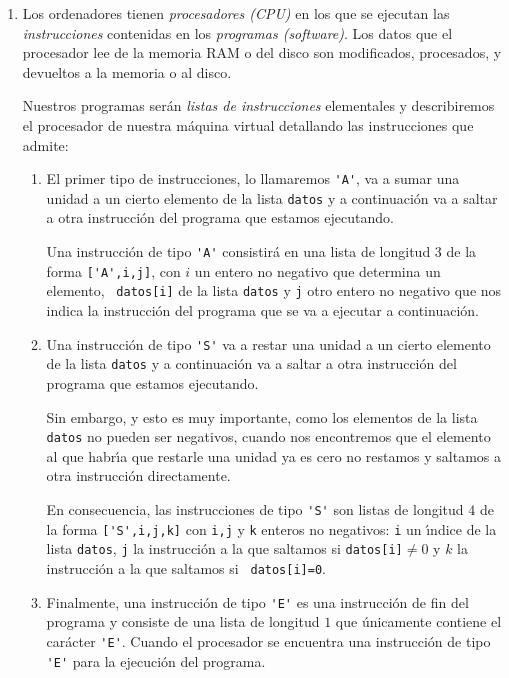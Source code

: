 \begin{appendices}
\begin{enumerate}
Nuestra m\'aquina virtual va a almacenar sus datos en una lista de enteros no
negativos de longitud arbitraria. 
Esta lista, a la que llamaremos {\tt datos},  va a simular al mismo tiempo la
memoria RAM y el disco duro.

\item Los ordenadores tienen {\itshape procesadores (CPU)} en los que se
ejecutan las {\itshape instrucciones} contenidas en los {\itshape programas
(software)}. Los datos que el procesador lee de la memoria RAM o del disco son
modificados, procesados, y devueltos a la memoria o al disco.


Nuestros programas ser\'an {\itshape listas de instrucciones} elementales y 
describiremos el procesador de nuestra m\'aquina virtual detallando las
instrucciones que admite:

\begin{enumerate}
 \item El primer tipo de instrucciones, lo llamaremos  \lstinline|'A'|, va a
sumar una
unidad a un cierto elemento de la lista {\tt datos} y a continuaci\'on va a
saltar a otra instrucci\'on del programa que estamos ejecutando. 

Una instrucci\'on de tipo \lstinline|'A'| consistir\'a en una lista de longitud
$3$ de
la forma 
\lstinline|['A',i,j]|, con $i$ un entero no negativo que determina un elemento,
{\tt
datos[i]} de la lista {\tt datos} y {\tt j} otro entero 
no negativo que nos indica la instrucci\'on del programa que se va a ejecutar a
continuaci\'on. 

\item Una instrucci\'on de tipo \lstinline|'S'| va a restar una unidad
a un cierto elemento de la lista {\tt datos} y a continuaci\'on va a saltar a
otra instrucci\'on del programa que estamos ejecutando. 

Sin embargo, y esto es {\sc muy importante}, como los elementos de la lista {\tt
datos} no pueden ser negativos, cuando nos encontremos que el elemento al que
habr\'{\i}a que restarle una unidad ya es cero no restamos y saltamos a otra
instrucci\'on directamente. 

En consecuencia, las instrucciones de tipo \lstinline|'S'| son listas de
longitud $4$
de la forma \lstinline|['S',i,j,k]| con {\tt i,j} y {\tt k} enteros no
negativos: {\tt i} un
\'{\i}ndice de la lista {\tt datos}, {\tt j} la instrucci\'on a la que saltamos
si
{\tt datos[i]}$\ne 0$ y $k$ la instrucci\'on a la que saltamos si {\tt
datos[i]=0}.
 \item Finalmente, una instrucci\'on de tipo \lstinline|'E'| es una
instrucci\'on de 
 fin del programa y consiste de una lista de longitud $1$ que \'unicamente 
 contiene el car\'acter \lstinline|'E'|. Cuando el procesador se encuentra una
instrucci\'on de tipo \lstinline|'E'| para la ejecuci\'on del programa.
 

\end{enumerate}
\end{enumerate}
\end{appendices}
